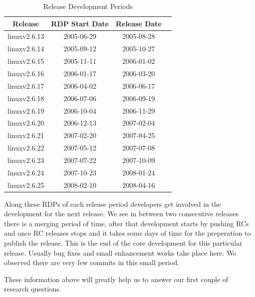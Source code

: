 \documentclass{acm_proc_article-sp}
\begin{document}
\begin{table}[ht]
\caption{Release Development Periods}  %
\centering 						%
\begin{tabular}{c c c c}				%
\hline\hline						%
Release 			& RDP Start Date	& Release Date \\ [0.5ex]
\hline 							%
linuxv2.6.13		& 2005-06-29	& 2005-08-28 \\
linuxv2.6.14		& 2005-09-12	& 2005-10-27 \\
linuxv2.6.15		& 2005-11-11	& 2006-01-02 \\
linuxv2.6.16		& 2006-01-17	& 2006-03-20 \\
linuxv2.6.17		& 2006-04-02	& 2006-06-17 \\
linuxv2.6.18		& 2006-07-06	& 2006-09-19 \\
linuxv2.6.19		& 2006-10-04	& 2006-11-29 \\
linuxv2.6.20  		& 2006-12-13	& 2007-02-04 \\
linuxv2.6.21		& 2007-02-20	& 2007-04-25 \\
linuxv2.6.22		& 2007-05-12	& 2007-07-08 \\
linuxv2.6.23		& 2007-07-22	& 2007-10-09 \\
linuxv2.6.24		& 2007-10-23	& 2008-01-24 \\
linuxv2.6.25		& 2008-02-10	& 2008-04-16 \\
[1ex]							%
\hline 							%
\end{tabular}
\label{table:nonlin} 				%
\end{table}

Along these RDPs of each release period developers get involved in the development for the next release. We see in between two consecutive releases there is a merging period of time, after that development starts by pushing RCs and once RC releases stops and it takes some days of time for the preperation to publish the release. This is the end of the core development for this particular release. Usually bug fixes and small enhancement works take place here. We observed there are very few commits in this small period.

These information above will greatly help us to answer our first couple of research questions.
\end{document}

